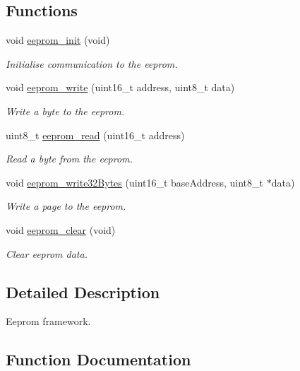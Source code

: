 \subsection*{Functions}
\begin{DoxyCompactItemize}
\item 
void \hyperlink{group___eeprom_ga4ec7f9d780da432051aa74ec5892a94c}{eeprom\+\_\+init} (void)
\begin{DoxyCompactList}\small\item\em Initialise communication to the eeprom. \end{DoxyCompactList}\item 
void \hyperlink{group___eeprom_ga11e27abf76759a5907ef18d1351aecdb}{eeprom\+\_\+write} (uint16\+\_\+t address, uint8\+\_\+t data)
\begin{DoxyCompactList}\small\item\em Write a byte to the eeprom. \end{DoxyCompactList}\item 
uint8\+\_\+t \hyperlink{group___eeprom_gafaa7cca6f6ad1d9ae49522324c825c2f}{eeprom\+\_\+read} (uint16\+\_\+t address)
\begin{DoxyCompactList}\small\item\em Read a byte from the eeprom. \end{DoxyCompactList}\item 
void \hyperlink{group___eeprom_ga4f1a1c3f7642565b9dbff6bfd2e7ed0d}{eeprom\+\_\+write32\+Bytes} (uint16\+\_\+t base\+Address, uint8\+\_\+t $\ast$data)
\begin{DoxyCompactList}\small\item\em Write a page to the eeprom. \end{DoxyCompactList}\item 
void \hyperlink{group___eeprom_ga7964a5a66da1c4a59a42309a93752217}{eeprom\+\_\+clear} (void)
\begin{DoxyCompactList}\small\item\em Clear eeprom data. \end{DoxyCompactList}\end{DoxyCompactItemize}


\subsection{Detailed Description}
Eeprom framework. 



\subsection{Function Documentation}
\mbox{\label{group___eeprom_ga7964a5a66da1c4a59a42309a93752217}} 
